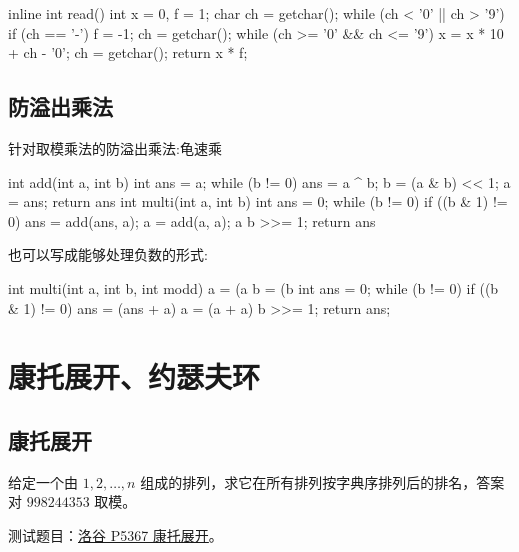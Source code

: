 \documentclass[UTF8,a4paper,11pt]{ctexart}
\newcommand{\topic}[1]{%
  \par\needspace{3\baselineskip}\vspace{0.45em}%
  \noindent{\bfseries\color{Primary}#1}\par\vspace{0.12em}%
}
\begin{document}
\begin{CodeBlock}
inline int read() {
    int x = 0, f = 1;
    char ch = getchar();
    while (ch < '0' || ch > '9') {
        if (ch == '-')
            f = -1;
        ch = getchar();
    }
    while (ch >= '0' && ch <= '9') {
        x = x * 10 + ch - '0';
        ch = getchar();
    }
    return x * f;
}
\end{CodeBlock}

\subsection{防溢出乘法}

针对取模乘法的防溢出乘法:龟速乘

\begin{CodeBlock}
int add(int a, int b) {
    int ans = a;
    while (b != 0) {
        ans = a ^ b;
        b = (a & b) << 1;
        a = ans;
    }
    return ans %
}
int multi(int a, int b) {
    int ans = 0;
    while (b != 0) {
        if ((b & 1) != 0)
            ans = add(ans, a);
        a = add(a, a);
        a %
        b >>= 1;
    }
    return ans %
}
\end{CodeBlock}

\topic{负数取模处理}

也可以写成能够处理负数的形式:

\begin{CodeBlock}
int multi(int a, int b, int modd) {
    a = (a %
    b = (b %
    int ans = 0;
    while (b != 0) {
        if ((b & 1) != 0)
            ans = (ans + a) %
        a = (a + a) %
        b >>= 1;
    }
    return ans;
}
\end{CodeBlock}

\clearpage
\section{康托展开、约瑟夫环}

\subsection{康托展开}

\topic{题目}

给定一个由 $1,2,\ldots,n$ 组成的排列，求它在所有排列按字典序排列后的排名，答案对 $998244353$ 取模。

测试题目：\href{https://www.luogu.com.cn/problem/P5367}{洛谷 P5367 康托展开}。
\end{document}
